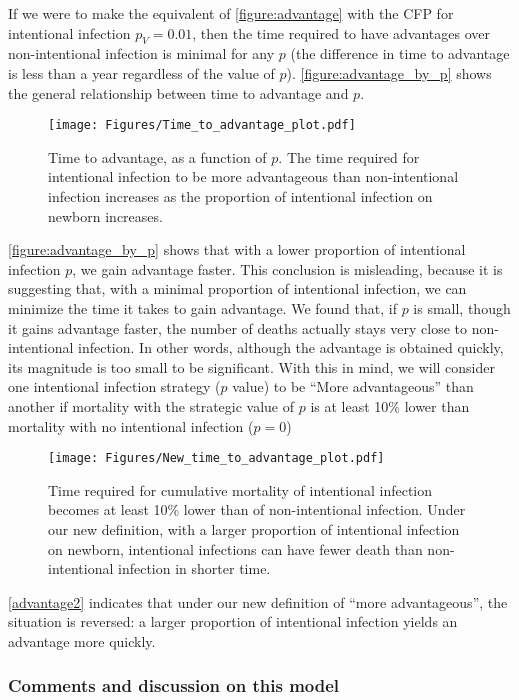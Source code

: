 \documentclass[12pt]{article}
\newcommand{\pmV}{p_{V}}
\begin{document}
If we were to make the equivalent of \autoref{figure:advantage} with the CFP for intentional infection $\pmV=0.01$, then the time required to have advantages over non-intentional infection is minimal for any $p$ (the difference in time to advantage is less than a year regardless of the value of $p$).
\autoref{figure:advantage_by_p} shows the general relationship between time to advantage and $p$.

\begin{figure}[H]
  \centering
  \texttt{[image: Figures/Time\_to\_advantage\_plot.pdf]}
  \caption{Time to advantage, as a function of $p$. The time required for intentional infection to be more advantageous than non-intentional infection increases as the proportion of intentional infection on newborn increases.}
\label{figure:advantage_by_p}
\end{figure}

\autoref{figure:advantage_by_p} shows that with a lower proportion of intentional infection $p$, we gain advantage faster. This conclusion is misleading, because it is suggesting that, with a minimal proportion of intentional infection, we can minimize the time it takes to gain advantage.
We found that, if $p$ is small, though it gains advantage faster, the number of deaths actually stays very close to non-intentional infection. In other words, although the advantage is obtained quickly, its magnitude is too small to be significant.  With this in mind, we will consider one intentional infection strategy ($p$ value) to be ``More advantageous'' than another if mortality with the strategic value of $p$ is at least 10\% lower than mortality with no intentional infection ($p=0$)

\begin{figure}[H]
  \caption{Time required for cumulative mortality of intentional infection becomes at least 10\% lower than of non-intentional infection. Under our new definition, with a larger proportion of intentional infection on newborn, intentional infections can have fewer death than non-intentional infection in shorter time.}\label{advantage2}
  \centering
  \texttt{[image: Figures/New\_time\_to\_advantage\_plot.pdf]}
\end{figure}
\autoref{advantage2} indicates that under our new definition of ``more advantageous'', the situation is reversed: a larger proportion of intentional infection yields an advantage more quickly.

\subsubsection{Comments and discussion on this model}
\end{document}
